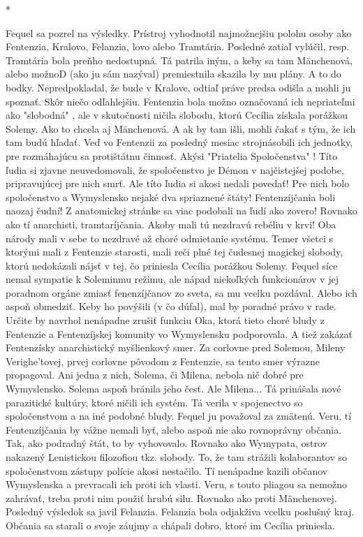 \documentclass{book}
\begin{document}
\begin{center}

*

\end{center}

Fequel sa pozrel na výsledky. Prístroj vyhodnotil najmožnejšiu polohu osoby ako Fentenzia, Kralovo, Felanzia, lovo alebo Tramtária. Posledné zatiaľ vylúčil, resp. Tramtária bola preňho nedostupná. Tá patrila iným, a keby sa tam Mänchenová, alebo možnoD (ako ju sám nazýval) premiestnila skazila by mu plány. A to do bodky. Nepredpokladal, že bude v Kralove, odtiaľ práve predsa odišla a mohli ju spoznať. Skôr niečo odľahlejšiu. Fentenzia bola možno označovaná ich nepriateľmi ako "$ $slobodná"$ $ , ale v skutočnosti ničila slobodu, ktorú Cecília získala porážkou Solemy. Ako to chcela aj Mänchenová. A ak by tam išli, mohli čakať s tým, že ich tam budú hľadať. Veď vo Fentenzii za posledný mesiac strojnásobili ich jednotky, pre rozmáhajúcu sa protištátnu činnosť. Akýsi "$ $Priatelia Spoločenstva"$ $ ! Títo ľudia si zjavne neuvedomovali, že spoločenstvo je Démon v najčistejšej podobe, pripravujúcej pre nich smrť. Ale títo ľudia si akosi nedali povedať! Pre nich bolo spoločenstvo a Wymyslensko nejaké dva spriaznené štáty! Fentenzíjčania boli naozaj čudní! Z anatomickej stránke sa viac podobali na ľudí ako zovero! Rovnako ako tí anarchisti, tramtaríjčania. Akoby mali tú nezdravú rebéliu v krvi! Oba národy mali v sebe to nezdravé až choré odmietanie systému. Temer všetci s ktorými mali z Fentenzie starosti, mali reči plné tej čudesnej magickej slobody, ktorú nedokázali nájsť v tej, čo priniesla Cecília porážkou Solemy. Fequel síce nemal sympatie k Soleminmu režimu, ale nápad niekoľkých funkcionárov v jej poradnom orgáne zmiasť fenenzíjčanov zo sveta, sa mu vcelku pozdával. Alebo ich aspoň obmedziť. Keby ho povýšili (v čo dúfal), mal by poradné právo v rade. Určite by navrhol nenápadne zrušiť funkciu Oka, ktorá tieto choré bludy z Fentenzie a Fentenzíjskej komunity vo Wymyslensku podporovala. A tiež zakázať Fentenzísky anarchistický myšlienkový smer. Za corlovne pred Solemou, Mileny Verighe'tovej, prvej corlovne pôvodom z Fentenzie, sa tento smer výrazne propagoval. Ani jedna z nich, Solema, či Milena, nebola nič dobré pre Wymyslensko. Solema aspoň bránila jeho česť. Ale Milena... Tá prinášala nové parazitické kultúry, ktoré ničili ich systém. Tá verila v spojenectvo so spoločenstvom a na iné podobné bludy. Fequel ju považoval za zmätenú. Veru, tí Fentenzíjčania by vážne nemali byť, alebo aspoň nie ako rovnoprávny občania. Tak, ako podradný štát, to by vyhovovalo. Rovnako ako Wymypata, ostrov nakazený Lenistickou filozofiou tkz. slobody. To, že tam strážili kolaborantov so spoločenstvom zástupy polície akosi nestačilo. Tí nenápadne kazili občanov Wymyslenska a prevracali ich proti ich vlasti. Veru, s touto pliagou sa nemožno zahrávať, treba proti nim použiť hrubú silu. Rovnako ako proti Mänchenovej. Posledný výsledok sa javil Felanzia. Felanzia bola odjakživa vcelku poslušný kraj. Občania sa starali o svoje záujmy a chápali dobro, ktoré im Cecília priniesla.
\end{document}
